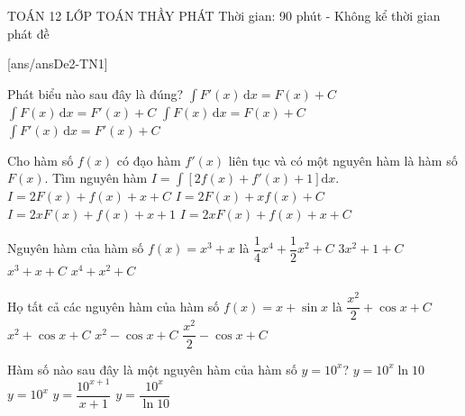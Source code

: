 \begin{name}
	{\tenchude}
	{TOÁN 12}
	{LỚP TOÁN THẦY PHÁT}
	{Thời gian: 90 phút - Không kể thời gian phát đề}
\end{name}
\TN
{}[ans/ansDe2-TN1]
\begin{ex}%
	Phát biểu nào sau đây là đúng?
	\choice
	{\True $\displaystyle\int\limits F'(x)\mathrm{\,d}x=F(x)+C$}
	{$\displaystyle\int\limits F(x)\mathrm{\,d}x=F'(x)+C$}
	{$\displaystyle\int\limits F(x)\mathrm{\,d}x=F(x)+C$}
	{$\displaystyle\int\limits F'(x)\mathrm{\,d}x=F'(x)+C$}
\end{ex}

\begin{ex}%
	Cho hàm số $ f(x) $ có đạo hàm $ f'(x) $ liên tục và có một nguyên hàm là hàm số $ F(x) $. Tìm nguyên hàm $ I=\displaystyle\int \left[2f(x)+f'(x)+1\right]\mathrm{d}x $.
	\choice
	{\True $ I=2F(x)+f(x)+x+C $}
	{$ I=2F(x)+xf(x)+C $}
	{$ I=2xF(x)+f(x)+x+1 $}
	{$ I=2xF(x)+f(x)+x+C $}
\end{ex}

\begin{ex}%
	Nguyên hàm của hàm số $f(x)=x^3+x$ là
	\choice
	{\True $\dfrac{1}{4}x^4+\dfrac{1}{2}x^2+C$}
	{$3x^2+1+C$}
	{$x^3+x+C$}
	{$x^4+x^2+C$}
\end{ex}

\begin{ex}%
	Họ tất cả các nguyên hàm của hàm số $f(x)=x+\sin x$ là
	\choice
	{$\dfrac{x^2}{2}+\cos x+C$}
	{$x^2+\cos x+C$}
	{$x^2-\cos x+C$}
	{\True $\dfrac{x^2}{2}-\cos x+C$}
\end{ex}

\begin{ex}%
	Hàm số nào sau đây là một nguyên hàm của hàm số $y=10^x$?
	\choice
	{$y=10^x \ln 10$}
	{$y=10^x$}
	{$y=\dfrac{10^{x+1}}{x+1}$}
	{\True $y=\dfrac{10^x}{\ln 10}$}
\end{ex}

